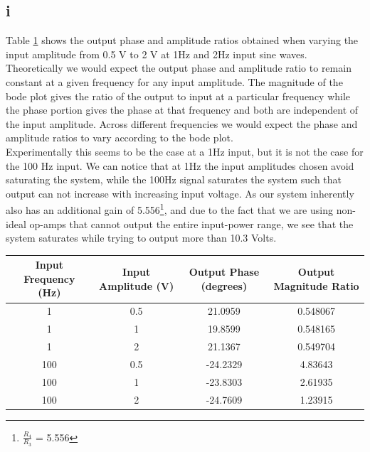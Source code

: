\documentclass{article}
\theoremstyle{plain}
\theoremstyle{definition}
\theoremstyle{remark}
\begin{document}
\subsection*{i}

Table \ref{q1_it} shows the output phase and amplitude ratios obtained when varying the input amplitude from 0.5 V to 2 V at 1Hz and 2Hz input sine waves.  Theoretically we would expect the output phase and amplitude ratio to remain constant at a given frequency for any input amplitude.  The magnitude of the bode plot gives the ratio of the output to input at a particular frequency while the phase portion gives the phase at that frequency and both are independent of the input amplitude.  Across different frequencies we would expect the phase and amplitude ratios to vary according to the bode plot.  \\

Experimentally this seems to be the case at a 1Hz input, but it is not the case for the 100 Hz input.  We can notice that at 1Hz the input amplitudes chosen avoid saturating the system, while the 100Hz signal saturates the system such that output can not increase with increasing input voltage. As our system inherently also has an additional gain of 5.556\footnote{$\frac{R_4}{R_3}$ = 5.556}, and due to the fact that we are using non-ideal op-amps that cannot output the entire input-power range, we see that the system saturates while trying to output more than 10.3 Volts.


\begin{table}[hbt]
\begin{center}
    \begin{tabular}{|c|c|c|c|}
        \hline
        Input Frequency (Hz) & Input Amplitude (V) & Output Phase (degrees) & Output Magnitude Ratio \\ \hline
        1                    & 0.5             & 21.0959                & 0.548067               \\ 
        1                    & 1               & 19.8599                & 0.548165               \\ 
        1                    & 2               & 21.1367                & 0.549704               \\ 
        100                  & 0.5             & -24.2329               & 4.83643                \\ 
        100                  & 1               & -23.8303               & 2.61935                \\ 
        100                  & 2               & -24.7609               & 1.23915                \\
        \hline
    \end{tabular}
\end{center}
\label{q1_it}
\end{table}
\end{document}
